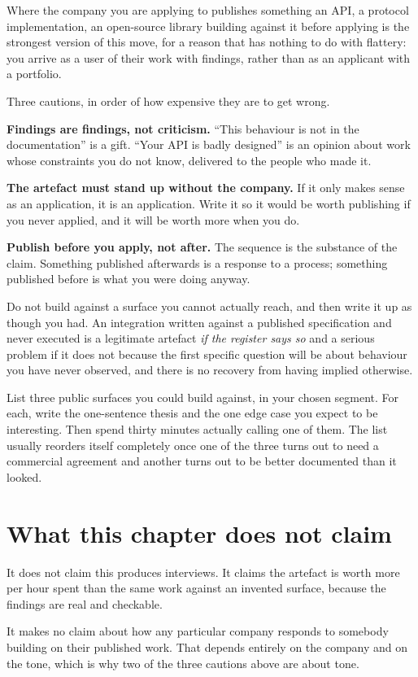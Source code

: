Where the company you are applying to publishes something \dash{} an API, a
protocol implementation, an open-source library \dash{} building against it
before applying is the strongest version of this move, for a reason that has
nothing to do with flattery: you arrive as a user of their work with findings,
rather than as an applicant with a portfolio.

Three cautions, in order of how expensive they are to get wrong.

\textbf{Findings are findings, not criticism.} ``This behaviour is not in the
documentation'' is a gift. ``Your API is badly designed'' is an opinion about
work whose constraints you do not know, delivered to the people who made it.

\textbf{The artefact must stand up without the company.} If it only makes sense
as an application, it is an application. Write it so it would be worth
publishing if you never applied, and it will be worth more when you do.

\textbf{Publish before you apply, not after.} The sequence is the substance of
the claim. Something published afterwards is a response to a process;
something published before is what you were doing anyway.

\begin{kittrap}
Do not build against a surface you cannot actually reach, and then write it up
as though you had. An integration written against a published specification and
never executed is a legitimate artefact \emph{if the register says so} and a
serious problem if it does not \dash{} because the first specific question will
be about behaviour you have never observed, and there is no recovery from
having implied otherwise.
\end{kittrap}

\begin{drill}
List three public surfaces you could build against, in your chosen segment.
For each, write the one-sentence thesis and the one edge case you expect to be
interesting. Then spend thirty minutes actually calling one of them. The list
usually reorders itself completely once one of the three turns out to need a
commercial agreement and another turns out to be better documented than it
looked.
\end{drill}

\section*{What this chapter does not claim}

It does not claim this produces interviews. It claims the artefact is worth more
per hour spent than the same work against an invented surface, because the
findings are real and checkable.

It makes no claim about how any particular company responds to somebody building
on their published work. That depends entirely on the company and on the tone,
which is why two of the three cautions above are about tone.
